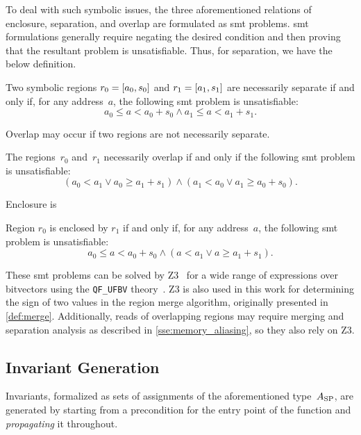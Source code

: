 To deal with such symbolic issues,
the three aforementioned relations of enclosure, separation, and overlap
are formulated as \ac{smt} problems.
\Ac{smt} formulations generally require negating the desired condition
and then proving that the resultant problem is unsatisfiable.
Thus, for separation, we have the below definition.
\begin{definition}
  Two symbolic regions $r_0=[a_0,s_0]$ and $r_1=[a_1,s_1]$
  are necessarily separate if and only if, for any address~$a$,
  the following \ac{smt} problem is unsatisfiable:
  \begin{equation*}
  a_0\leq a<a_0+s_0\wedge a_1\leq a<a_1+s_1.
  \end{equation*}
\end{definition}
Overlap may occur if two regions are not necessarily separate.
\begin{definition}
  The regions~$r_0$ and~$r_1$ necessarily overlap if and only if
  the following \ac{smt} problem is unsatisfiable:
  \begin{equation*}
  (a_0<a_1\vee a_0\geq a_1+s_1)\wedge(a_1<a_0\vee a_1\geq a_0+s_0).
  \end{equation*}
\end{definition}
Enclosure is 
\begin{definition}
  Region $r_0$ is enclosed by $r_1$ if and only if,
  for any address~$a$, the following \ac{smt} problem is unsatisfiable:
  \begin{equation*}
  a_0\leq a<a_0+s_0\wedge(a<a_1\vee a \geq a_1 + s_1).
  \end{equation*}
\end{definition}
These \ac{smt} problems can be solved by Z3~\citep{de2008z3}
for a wide range of expressions over bitvectors
using the \texttt{QF\_UFBV} theory~\citep{barrett2017smt}.
Z3 is also used in this work for determining the sign of two values
in the region merge algorithm, originally presented in \cref{def:merge}.
Additionally, reads of overlapping regions may require merging
and separation analysis as described in \cref{sse:memory_aliasing},
so they also rely on Z3.

\subsection{Invariant Generation}\label{sse:inv_gen}
Invariants, formalized as sets of assignments of the aforementioned type~$A_\mathrm{SP}$,
are generated by starting from a precondition for the entry point of the function
and \emph{propagating} it throughout.%

